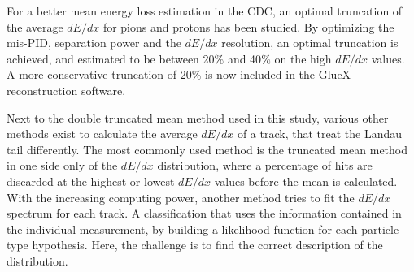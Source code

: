For a better mean energy loss estimation in the CDC, an optimal truncation of the average $dE/dx$ for pions and protons has been studied. By optimizing the mis-PID, separation power and the $dE/dx$ resolution, an optimal truncation is achieved, and estimated to be between 20$\%$ and 40$\%$ on the high $dE/dx$ values. A more conservative truncation of 20$\%$ is now included in the GlueX reconstruction software.
~\par Next to the double truncated mean method used in this study, various other methods exist to calculate the average $dE/dx$ of a track, that treat the Landau tail differently. The most commonly used method is the truncated mean method in one side only of the $dE/dx$ distribution, where a percentage of hits are discarded at the highest or lowest $dE/dx$ values before the mean is calculated. With the increasing computing power, another method tries to fit the $dE/dx$ spectrum for each track. A classification that uses the information contained in the individual measurement, by building a likelihood function for each particle type hypothesis. Here, the challenge is to find the correct description of the distribution.